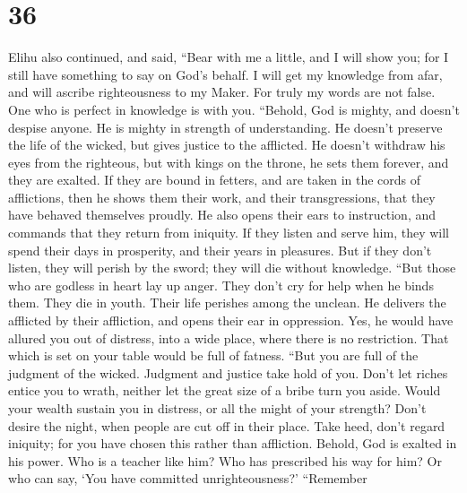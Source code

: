 \hypertarget{section-35}{%
\section{36}\label{section-35}}

 Elihu also continued, and said,  ``Bear
with me a little, and I will show you; for I still have something to say
on God's behalf.  I will get my knowledge from afar, and
will ascribe righteousness to my Maker.  For truly my
words are not false. One who is perfect in knowledge is with you.
 ``Behold, God is mighty, and doesn't despise anyone. He
is mighty in strength of understanding.  He doesn't
preserve the life of the wicked, but gives justice to the afflicted.
 He doesn't withdraw his eyes from the righteous, but with
kings on the throne, he sets them forever, and they are exalted.
 If they are bound in fetters, and are taken in the cords
of afflictions,  then he shows them their work, and their
transgressions, that they have behaved themselves proudly.
 He also opens their ears to instruction, and commands
that they return from iniquity.  If they listen and serve
him, they will spend their days in prosperity, and their years in
pleasures.  But if they don't listen, they will perish by
the sword; they will die without knowledge.  ``But those
who are godless in heart lay up anger. They don't cry for help when he
binds them.  They die in youth. Their life perishes among
the unclean.  He delivers the afflicted by their
affliction, and opens their ear in oppression.  Yes, he
would have allured you out of distress, into a wide place, where there
is no restriction. That which is set on your table would be full of
fatness.  ``But you are full of the judgment of the
wicked. Judgment and justice take hold of you.  Don't let
riches entice you to wrath, neither let the great size of a bribe turn
you aside.  Would your wealth sustain you in distress, or
all the might of your strength?  Don't desire the night,
when people are cut off in their place.  Take heed, don't
regard iniquity; for you have chosen this rather than affliction.
 Behold, God is exalted in his power. Who is a teacher
like him?  Who has prescribed his way for him? Or who can
say, `You have committed unrighteousness?'  ``Remember
